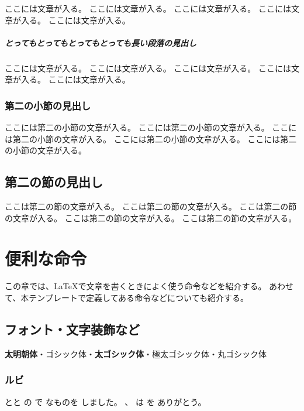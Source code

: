 \documentclass[ %
	uplatex,%
	a5paper,%
	papersize%
	]{jsbook}
\begin{document}
						ここには文章が入る。
						ここには文章が入る。
						ここには文章が入る。
						ここには文章が入る。
						ここには文章が入る。

						\paragraph{とってもとってもとってもとっても長い段落の見出し}

						ここには文章が入る。
						ここには文章が入る。
						ここには文章が入る。
						ここには文章が入る。
						ここには文章が入る。

						\subsection{第二の小節の見出し}

						ここには第二の小節の文章が入る。
						ここには第二の小節の文章が入る。
						ここには第二の小節の文章が入る。
						ここには第二の小節の文章が入る。
						ここには第二の小節の文章が入る。

						\section{第二の節の見出し}

						ここは第二の節の文章が入る。
						ここは第二の節の文章が入る。
						ここは第二の節の文章が入る。
						ここは第二の節の文章が入る。
						ここは第二の節の文章が入る。

						\chapter{便利な命令}

						\begin{summary}
							この章では、\LaTeX で文章を書くときによく使う命令などを紹介する。
							あわせて、本テンプレートで定義してある命令などについても紹介する。
						\end{summary}

						\section{フォント・文字装飾など}
						{\mcfamily\bfseries 太明朝体}・{\gtfamily ゴシック体}・{\gtfamily\bfseries 太ゴシック体}・{\gtfamily\ebseries 極太ゴシック体}・{\mgfamily 丸ゴシック体} 



						\subsection{ルビ}
						とと
						の
						で
						なものを
						しました。
						、
						は
						を
						ありがとう。
\end{document}
